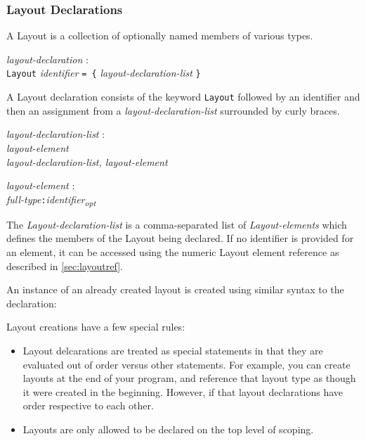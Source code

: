 \documentclass{article}
\begin{document}
\subsubsection{Layout Declarations}
\label{sec:layout}
A Layout is a collection of optionally named members of various types.
\begin{tabbing}
	\= \emph{layout}\=\emph{-declaration} : \\
		\> \> \texttt{Layout} \emph{identifier} \texttt{= \{} \emph{layout-declaration-list} \texttt{\}}
\end{tabbing}
A Layout declaration consists of the keyword \texttt{Layout} followed by an identifier and then an assignment from a  \emph{layout-declaration-list} surrounded by curly braces. 
\begin{tabbing}
	\= \emph{layout}\=\emph{-declaration-list} : \\
		\> \> \emph{layout-element} \\
		\>\> \emph{layout-declaration-list, layout-element}
\end{tabbing}
\begin{tabbing}
	\= \emph{layout}\=\emph{-element} : \\
		\> \> \emph{full-type}\texttt{:}\emph{identifier\textsubscript{opt}}
\end{tabbing}
The \emph{Layout-declaration-list} is a comma-separated list of \emph{Layout-elements} which defines the members of the Layout being declared. If no identifier is provided for an element, it can be accessed using the numeric Layout element reference as described in \ref{sec:layoutref}. 

An instance of an already created layout is created using similar syntax to the declaration:

Layout creations have a few special rules: 
\begin{itemize}

\item Layout delcarations are treated as special statements in that they are evaluated out of order versus other statements. For example, you can create layouts at the end of your program, and reference that layout type as though it were created in the beginning. However, if that layout declarations have order respective to each other.

\item Layouts are only allowed to be declared on the top level of scoping.

\end{itemize}
\end{document}
